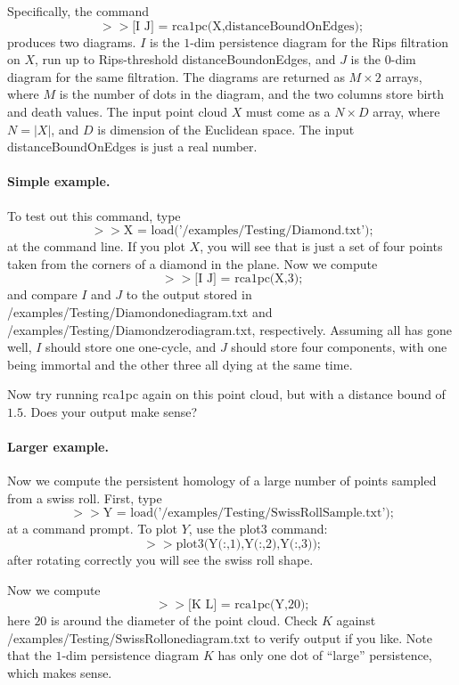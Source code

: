 \documentclass[a4paper,10pt]{article}
\begin{document}
Specifically, the command $$>> \mbox{[I J] = rca1pc(X,distanceBoundOnEdges)};$$
produces two diagrams. 
$I$ is the $1$-dim persistence diagram for the Rips filtration on $X$, run up to Rips-threshold distanceBoundonEdges,
and $J$ is the $0$-dim diagram for the same filtration.
The diagrams are returned as $M \times 2$ arrays, where $M$ is the number of dots in the diagram,
and the two columns store birth and death values.
The input point cloud $X$ must come as a $N \times D$ array, where $N = |X|$, and $D$ is dimension of the Euclidean space.
The input distanceBoundOnEdges is just a real number.

\paragraph{Simple example.}

To test out this command, type
$$ >> \mbox{X = load('/examples/Testing/Diamond.txt');}$$
at the command line.
If you plot $X$, you will see that is just a set of four points taken from the corners of a diamond in the plane.
Now we compute
$$ >> \mbox {[I J] = rca1pc(X,3);}$$
and compare $I$ and $J$ to the output stored in /examples/Testing/Diamondonediagram.txt and /examples/Testing/Diamondzerodiagram.txt, respectively.
Assuming all has gone well, $I$ should store one one-cycle, and $J$ should store four components, with one being immortal
and the other three all dying at the same time.

Now try running rca1pc again on this point cloud, but with a distance bound of $1.5$. Does your output make sense?

\paragraph{Larger example.}

Now we compute the persistent homology of a large number of points sampled from a swiss roll.
First, type
$$ >> \mbox{Y = load('/examples/Testing/SwissRollSample.txt');}$$
at a command prompt. To plot $Y$, use the plot3 command:
$$ >> \mbox{plot3(Y(:,1),Y(:,2),Y(:,3));}$$
after rotating correctly you will see the swiss roll shape.

Now we compute
$$ >> \mbox {[K L] = rca1pc(Y,20);}$$
here $20$ is around the diameter of the point cloud.
Check $K$ against /examples/Testing/SwissRollonediagram.txt to verify output if you like.
Note that the $1$-dim persistence diagram $K$ has only one dot of ``large'' persistence, which makes sense.
\end{document}
